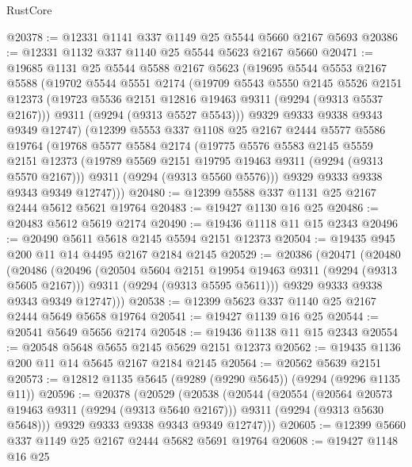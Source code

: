 \begin{lexlean}{RustCore}
\begin{coremodule}
@20378 := @12331 @1141 @337 @1149 @25 @5544 @5660 @2167 @5693
@20386 := @12331 @1132 @337 @1140 @25 @5544 @5623 @2167 @5660
@20471 := @19685
    @1131
    @25
    @5544
    @5588
    @2167
    @5623
    (@19695
      @5544
      @5553
      @2167
      @5588
      (@19702
        @5544
        @5551
        @2174
        (@19709
          @5543
          @5550
          @2145
          @5526
          @2151
          @12373
          (@19723 @5536 @2151 @12816 @19463 @9311 (@9294 (@9313 @5537 @2167)))
          @9311
          (@9294 (@9313 @5527 @5543)))
        @9329
        @9333
        @9338
        @9343
        @9349
        @12747)
      (@12399
        @5553
        @337
        @1108
        @25
        @2167
        @2444
        @5577
        @5586
        @19764
        (@19768
          @5577
          @5584
          @2174
          (@19775
            @5576
            @5583
            @2145
            @5559
            @2151
            @12373
            (@19789 @5569 @2151 @19795 @19463 @9311 (@9294 (@9313 @5570 @2167)))
            @9311
            (@9294 (@9313 @5560 @5576)))
          @9329
          @9333
          @9338
          @9343
          @9349
          @12747)))
@20480 := @12399 @5588 @337 @1131 @25 @2167 @2444 @5612 @5621 @19764
@20483 := @19427 @1130 @16 @25
@20486 := @20483 @5612 @5619 @2174
@20490 := @19436 @1118 @11 @15 @2343
@20496 := @20490 @5611 @5618 @2145 @5594 @2151 @12373
@20504 := @19435 @945 @200 @11 @14 @4495 @2167 @2184 @2145
@20529 := @20386
    (@20471
      (@20480
        (@20486
          (@20496
            (@20504 @5604 @2151 @19954 @19463 @9311 (@9294 (@9313 @5605 @2167)))
            @9311
            (@9294 (@9313 @5595 @5611)))
          @9329
          @9333
          @9338
          @9343
          @9349
          @12747)))
@20538 := @12399 @5623 @337 @1140 @25 @2167 @2444 @5649 @5658 @19764
@20541 := @19427 @1139 @16 @25
@20544 := @20541 @5649 @5656 @2174
@20548 := @19436 @1138 @11 @15 @2343
@20554 := @20548 @5648 @5655 @2145 @5629 @2151 @12373
@20562 := @19435 @1136 @200 @11 @14 @5645 @2167 @2184 @2145
@20564 := @20562 @5639 @2151
@20573 := @12812 @1135 @5645 (@9289 (@9290 @5645)) (@9294 (@9296 @1135 @11))
@20596 := @20378
    (@20529
      (@20538
        (@20544
          (@20554
            (@20564 @20573 @19463 @9311 (@9294 (@9313 @5640 @2167)))
            @9311
            (@9294 (@9313 @5630 @5648)))
          @9329
          @9333
          @9338
          @9343
          @9349
          @12747)))
@20605 := @12399 @5660 @337 @1149 @25 @2167 @2444 @5682 @5691 @19764
@20608 := @19427 @1148 @16 @25

\end{coremodule}
\end{lexlean}
